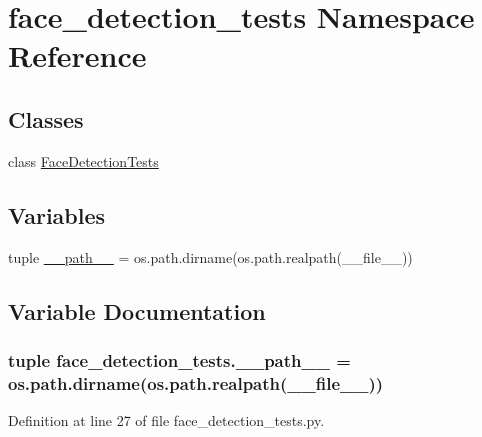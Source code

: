 \hypertarget{namespaceface__detection__tests}{\section{face\-\_\-detection\-\_\-tests Namespace Reference}
\label{namespaceface__detection__tests}
}
\subsection*{Classes}
\begin{DoxyCompactItemize}
\item 
class \hyperlink{classface__detection__tests_1_1FaceDetectionTests}{Face\-Detection\-Tests}
\end{DoxyCompactItemize}
\subsection*{Variables}
\begin{DoxyCompactItemize}
\item 
tuple \hyperlink{namespaceface__detection__tests_a42d01048c5cd2bada1f3ee192f5af354}{\-\_\-\-\_\-path\-\_\-\-\_\-} = os.\-path.\-dirname(os.\-path.\-realpath(\-\_\-\-\_\-file\-\_\-\-\_\-))
\end{DoxyCompactItemize}


\subsection{Variable Documentation}
\hypertarget{namespaceface__detection__tests_a42d01048c5cd2bada1f3ee192f5af354}{
\subsubsection[{\-\_\-\-\_\-path\-\_\-\-\_\-}]{\setlength{\rightskip}{0pt plus 5cm}tuple face\-\_\-detection\-\_\-tests.\-\_\-\-\_\-path\-\_\-\-\_\- = os.\-path.\-dirname(os.\-path.\-realpath(\-\_\-\-\_\-file\-\_\-\-\_\-))}}\label{namespaceface__detection__tests_a42d01048c5cd2bada1f3ee192f5af354}


Definition at line 27 of file face\-\_\-detection\-\_\-tests.\-py.

